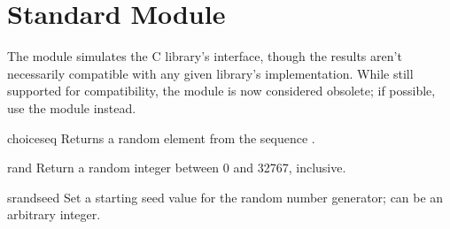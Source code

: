\section{Standard Module }
\label{module-rand}

The  module simulates the C library's 
interface, though the results aren't necessarily compatible with any
given library's implementation.  While still supported for
compatibility, the  module is now considered obsolete; if
possible, use the  module instead.

\begin{funcdesc}{choice}{seq}
Returns a random element from the sequence .
\end{funcdesc}

\begin{funcdesc}{rand}{}
Return a random integer between 0 and 32767, inclusive.
\end{funcdesc}

\begin{funcdesc}{srand}{seed}
Set a starting seed value for the random number generator; 
can be an arbitrary integer. 
\end{funcdesc}

\begin{seealso}
\end{seealso}

